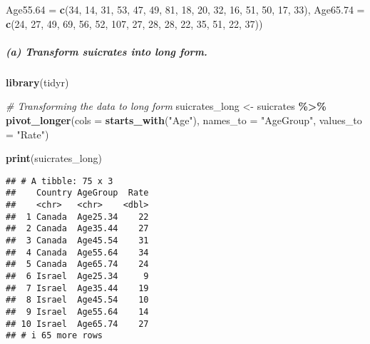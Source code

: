 \documentclass[
]{article}
\newenvironment{Shaded}{\begin{snugshade}}{\end{snugshade}}
\newcommand{\AttributeTok}[1]{\textcolor[rgb]{0.13,0.29,0.53}{#1}}
\newcommand{\CommentTok}[1]{\textcolor[rgb]{0.56,0.35,0.01}{\textit{#1}}}
\newcommand{\DecValTok}[1]{\textcolor[rgb]{0.00,0.00,0.81}{#1}}
\newcommand{\FunctionTok}[1]{\textcolor[rgb]{0.13,0.29,0.53}{\textbf{#1}}}
\newcommand{\NormalTok}[1]{#1}
\newcommand{\OtherTok}[1]{\textcolor[rgb]{0.56,0.35,0.01}{#1}}
\newcommand{\SpecialCharTok}[1]{\textcolor[rgb]{0.81,0.36,0.00}{\textbf{#1}}}
\newcommand{\StringTok}[1]{\textcolor[rgb]{0.31,0.60,0.02}{#1}}
\begin{document}
\begin{Shaded}
\begin{Highlighting}[]
 \AttributeTok{Age55.64 =} \FunctionTok{c}\NormalTok{(}\DecValTok{34}\NormalTok{, }\DecValTok{14}\NormalTok{, }\DecValTok{31}\NormalTok{, }\DecValTok{53}\NormalTok{, }\DecValTok{47}\NormalTok{, }\DecValTok{49}\NormalTok{, }\DecValTok{81}\NormalTok{, }\DecValTok{18}\NormalTok{, }\DecValTok{20}\NormalTok{, }\DecValTok{32}\NormalTok{, }\DecValTok{16}\NormalTok{, }\DecValTok{51}\NormalTok{, }\DecValTok{50}\NormalTok{, }\DecValTok{17}\NormalTok{, }\DecValTok{33}\NormalTok{),}
 \AttributeTok{Age65.74 =} \FunctionTok{c}\NormalTok{(}\DecValTok{24}\NormalTok{, }\DecValTok{27}\NormalTok{, }\DecValTok{49}\NormalTok{, }\DecValTok{69}\NormalTok{, }\DecValTok{56}\NormalTok{, }\DecValTok{52}\NormalTok{, }\DecValTok{107}\NormalTok{, }\DecValTok{27}\NormalTok{, }\DecValTok{28}\NormalTok{, }\DecValTok{28}\NormalTok{, }\DecValTok{22}\NormalTok{, }\DecValTok{35}\NormalTok{, }\DecValTok{51}\NormalTok{, }\DecValTok{22}\NormalTok{, }\DecValTok{37}\NormalTok{))}
\end{Highlighting}
\end{Shaded}

\subparagraph{(a) Transform suicrates into long
form.}\label{a-transform-suicrates-into-long-form.}

\begin{Shaded}
\begin{Highlighting}[]
 \FunctionTok{library}\NormalTok{(tidyr)}

\CommentTok{\# Transforming the data to long form}
\NormalTok{suicrates\_long }\OtherTok{\textless{}{-}}\NormalTok{ suicrates }\SpecialCharTok{\%\textgreater{}\%}
  \FunctionTok{pivot\_longer}\NormalTok{(}\AttributeTok{cols =} \FunctionTok{starts\_with}\NormalTok{(}\StringTok{"Age"}\NormalTok{), }\AttributeTok{names\_to =} \StringTok{"AgeGroup"}\NormalTok{, }\AttributeTok{values\_to =} \StringTok{"Rate"}\NormalTok{)}

\FunctionTok{print}\NormalTok{(suicrates\_long)}
\end{Highlighting}
\end{Shaded}

\begin{verbatim}
## # A tibble: 75 x 3
##    Country AgeGroup  Rate
##    <chr>   <chr>    <dbl>
##  1 Canada  Age25.34    22
##  2 Canada  Age35.44    27
##  3 Canada  Age45.54    31
##  4 Canada  Age55.64    34
##  5 Canada  Age65.74    24
##  6 Israel  Age25.34     9
##  7 Israel  Age35.44    19
##  8 Israel  Age45.54    10
##  9 Israel  Age55.64    14
## 10 Israel  Age65.74    27
## # i 65 more rows
\end{verbatim}
\end{document}
